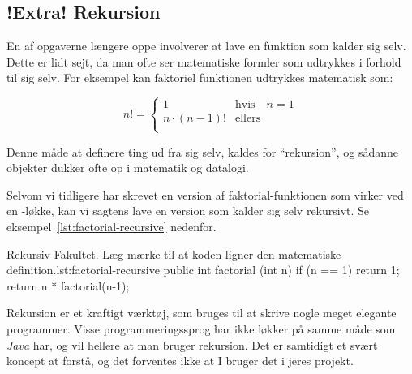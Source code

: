 	\subsection{!Extra! Rekursion}

        En af opgaverne længere  oppe
        involverer at lave en funktion som kalder sig selv. Dette er
        lidt sejt, da man ofte ser matematiske formler som udtrykkes i
        forhold til sig selv. For eksempel kan faktoriel funktionen
        udtrykkes matematisk som:

        \begin{equation}
            n! = \begin{cases}
                       1 & \text{hvis} \quad n = 1 \\
                       n\cdot(n-1)! & \text{ellers} \\
                  \end{cases}
        \end{equation}

        Denne måde at definere ting ud fra sig selv, kaldes for
        ``rekursion'', og sådanne objekter dukker ofte op i matematik
        og datalogi.


        Selvom vi tidligere har skrevet en version af
        faktorial-funktionen som virker ved en -løkke,
        kan vi sagtens lave en version som kalder sig selv rekursivt.
        Se eksempel~\ref{lst:factorial-recursive} nedenfor.

        \begin{JavaCode}{Rekursiv Fakultet. Læg mærke til at koden ligner den matematiske definition.}{lst:factorial-recursive}
            public int factorial (int n) {
                if (n == 1)   return 1;
                return n * factorial(n-1);
            }
        \end{JavaCode}

        Rekursion er et kraftigt værktøj, som bruges til at skrive
        nogle meget elegante programmer. Visse programmeringssprog har
        ikke løkker på samme måde som \emph{Java} har, og vil hellere
        at man bruger rekursion.  Det er samtidigt et svært koncept at
        forstå, og det forventes ikke at I bruger det i jeres projekt.

